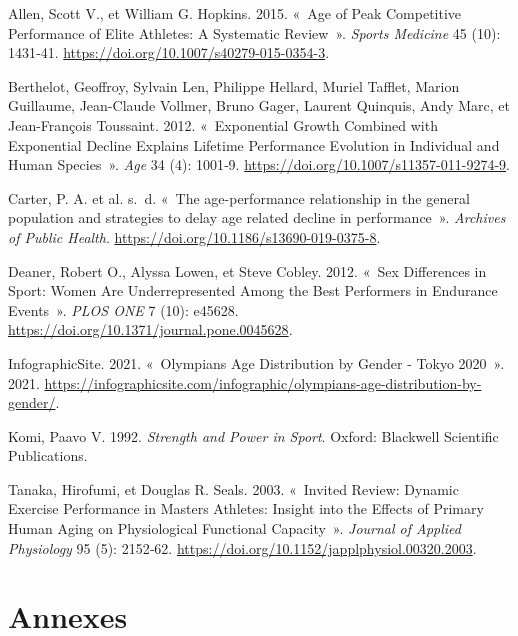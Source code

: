 \documentclass[
  french,
  11pt,
  a4paper,
]{article}
\newlength{\cslhangindent}
\newenvironment{CSLReferences}[2] %
 {\begin{list}{}{%
  \setlength{\itemindent}{0pt}
  \setlength{\leftmargin}{0pt}
  \setlength{\parsep}{0pt}
  \ifodd #1
   \setlength{\leftmargin}{\cslhangindent}
   \setlength{\itemindent}{-1\cslhangindent}
  \fi
  \setlength{\itemsep}{#2\baselineskip}}}
 {\end{list}}
\begin{document}
\label{refs}
\begin{CSLReferences}{1}{0}
Allen, Scott V., et William G. Hopkins. 2015. {«~Age of Peak Competitive
Performance of Elite Athletes: A Systematic Review~»}. \emph{Sports
Medicine} 45 (10): 1431‑41.
\url{https://doi.org/10.1007/s40279-015-0354-3}.

Berthelot, Geoffroy, Sylvain Len, Philippe Hellard, Muriel Tafflet,
Marion Guillaume, Jean-Claude Vollmer, Bruno Gager, Laurent Quinquis,
Andy Marc, et Jean-François Toussaint. 2012. {«~Exponential Growth
Combined with Exponential Decline Explains Lifetime Performance
Evolution in Individual and Human Species~»}. \emph{Age} 34 (4): 1001‑9.
\url{https://doi.org/10.1007/s11357-011-9274-9}.

Carter, P. A. et al. s.~d. {«~The age-performance relationship in the
general population and strategies to delay age related decline in
performance~»}. \emph{Archives of Public Health}.
\url{https://doi.org/10.1186/s13690-019-0375-8}.

Deaner, Robert O., Alyssa Lowen, et Steve Cobley. 2012. {«~Sex
Differences in Sport: Women Are Underrepresented Among the Best
Performers in Endurance Events~»}. \emph{PLOS ONE} 7 (10): e45628.
\url{https://doi.org/10.1371/journal.pone.0045628}.

InfographicSite. 2021. {«~Olympians Age Distribution by Gender - Tokyo
2020~»}. 2021.
\url{https://infographicsite.com/infographic/olympians-age-distribution-by-gender/}.

Komi, Paavo V. 1992. \emph{Strength and Power in Sport}. Oxford:
Blackwell Scientific Publications.

Tanaka, Hirofumi, et Douglas R. Seals. 2003. {«~Invited Review: Dynamic
Exercise Performance in Masters Athletes: Insight into the Effects of
Primary Human Aging on Physiological Functional Capacity~»}.
\emph{Journal of Applied Physiology} 95 (5): 2152‑62.
\url{https://doi.org/10.1152/japplphysiol.00320.2003}.

\end{CSLReferences}

\newpage

\section*{Annexes}\label{annexes}
\end{document}
